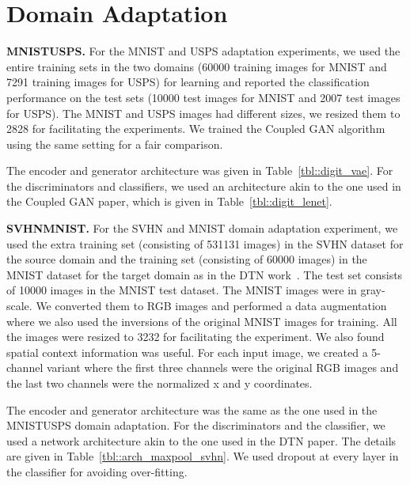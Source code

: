 \documentclass{article}
\begin{document}
\section{Domain Adaptation}\label{app::domain}

{\bf MNISTUSPS.} For the MNIST and USPS adaptation experiments, we used the entire training sets in the two domains (60000 training images for MNIST and 7291 training images for USPS) for learning and reported the classification performance on the test sets (10000 test images for MNIST and 2007 test images for USPS). The MNIST and USPS images had different sizes, we resized them to 2828 for facilitating the experiments. We trained the Coupled GAN algorithm~\cite{liu2016coupled} using the same setting for a fair comparison. 

The encoder and generator architecture was given in Table~\ref{tbl::digit_vae}. For the discriminators and classifiers, we used an architecture akin to the one used in the Coupled GAN paper, which is given in Table~\ref{tbl::digit_lenet}.

{\bf SVHNMNIST.} For the SVHN and MNIST domain adaptation experiment, we used the extra training set (consisting of 531131 images) in the SVHN dataset for the source domain and the training set (consisting of 60000 images) in the MNIST dataset for the target domain as in the DTN work~\cite{taigman2016unsupervised}. The test set consists of 10000 images in the MNIST test dataset. The MNIST images were in gray-scale. We converted them to RGB images and performed a data augmentation where we also used the inversions of the original MNIST images for training. All the images were resized to 3232 for facilitating the experiment. We also found spatial context information was useful. For each input image, we created a 5-channel variant where the first three channels were the original RGB images and the last two channels were the normalized x and y coordinates.

The encoder and generator architecture was the same as the one used in the MNISTUSPS domain adaptation. For the discriminators and the classifier, we 
used a network architecture akin to the one used in the DTN paper. The details are given in Table~\ref{tbl::arch_maxpool_svhn}. We used dropout at every layer in the classifier for avoiding over-fitting.
\end{document}
